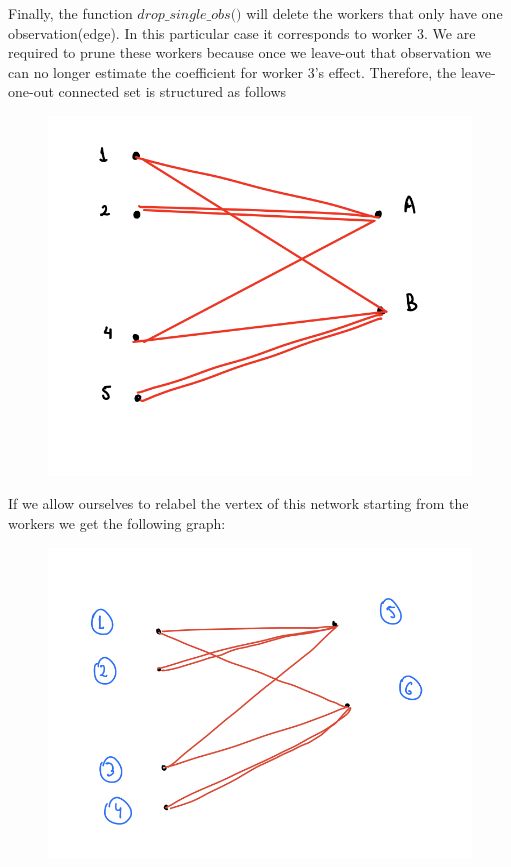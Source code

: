 \documentclass[12pt]{article}
\begin{document}
Finally, the function $\textit{drop\_single\_obs()}$ will delete the workers that only have one observation(edge). In this particular case it corresponds to worker 3. We are required to prune these workers because once we leave-out that observation we can no longer estimate the coefficient for worker 3's effect. Therefore, the leave-one-out connected set is structured as follows

\begin{figure}[h!]
    \centering
\includegraphics[scale=0.6]{leaveoutnetwork.png}    
\end{figure}

If we allow ourselves to relabel the vertex of this network starting from the workers we get the following graph: 

\begin{figure}[H]
    \centering
\includegraphics[scale=0.6]{leaveoutnetwork_relabeled.png}    
\end{figure}
\end{document}
